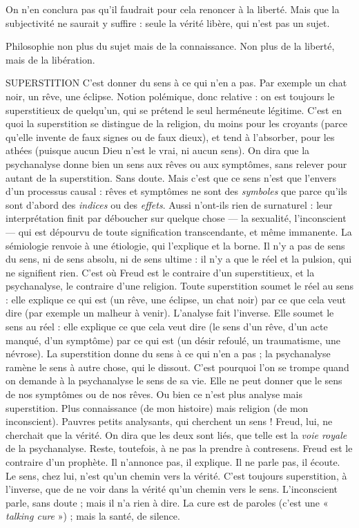 On n’en conclura pas qu’il faudrait pour cela renoncer à la liberté. Mais
que la subjectivité ne saurait y suffire : seule la vérité libère, qui n'est pas un
sujet.

Philosophie non plus du sujet mais de la connaissance. Non plus de la
liberté, mais de la libération.

SUPERSTITION C’est donner du sens à ce qui n’en a pas. Par exemple un
chat noir, un rêve, une éclipse. Notion polémique, donc
relative : on est toujours le superstitieux de quelqu'un, qui se prétend le seul
herméneute légitime. C’est en quoi la superstition se distingue de la religion,
du moins pour les croyants (parce qu’elle invente de faux signes ou de faux
dieux), et tend à l’absorber, pour les athées (puisque aucun Dieu n’est le vrai,
ni aucun sens).
On dira que la psychanalyse donne bien un sens aux rêves ou aux symptômes,
sans relever pour autant de la superstition. Sans doute. Mais c’est que
ce sens n’est que l’envers d’un processus causal : rêves et symptômes ne sont des
{\it symboles} que parce qu’ils sont d’abord des {\it indices} ou des {\it effets}. Aussi n’ont-ils
rien de surnaturel : leur interprétation finit par déboucher sur quelque chose —
la sexualité, l'inconscient — qui est dépourvu de toute signification transcendante,
et même immanente. La sémiologie renvoie à une étiologie, qui
l'explique et la borne. Il n’y a pas de sens du sens, ni de sens absolu, ni de sens
ultime : il n’y a que le réel et la pulsion, qui ne signifient rien. C’est où Freud
est le contraire d’un superstitieux, et la psychanalyse, le contraire d’une religion.
Toute superstition soumet le réel au sens : elle explique ce qui est (un
rêve, une éclipse, un chat noir) par ce que cela veut dire (par exemple un malheur
à venir). L'analyse fait l'inverse. Elle soumet le sens au réel : elle explique
ce que cela veut dire (le sens d’un rêve, d’un acte manqué, d’un symptôme) par
ce qui est (un désir refoulé, un traumatisme, une névrose). La superstition
donne du sens à ce qui n’en a pas ; la psychanalyse ramène le sens à autre chose,
qui le dissout. C’est pourquoi l’on se trompe quand on demande à la psychanalyse
le sens de sa vie. Elle ne peut donner que le sens de nos symptômes ou
de nos rêves. Ou bien ce n’est plus analyse mais superstition. Plus connaissance
(de mon histoire) mais religion (de mon inconscient). Pauvres petits analysants,
qui cherchent un sens ! Freud, lui, ne cherchait que la vérité. On dira que les
deux sont liés, que telle est la {\it voie royale} de la psychanalyse. Reste, toutefois,
à ne pas la prendre à contresens. Freud est le contraire d’un prophète. Il
n'annonce pas, il explique. Il ne parle pas, il écoute. Le sens, chez lui, n’est
qu'un chemin vers la vérité. C’est toujours superstition, à l'inverse, que de ne
voir dans la vérité qu’un chemin vers le sens. L’inconscient parle, sans doute ;
mais il n’a rien à dire. La cure est de paroles (c’est une « {\it talking cure} ») ; mais la
santé, de silence.

